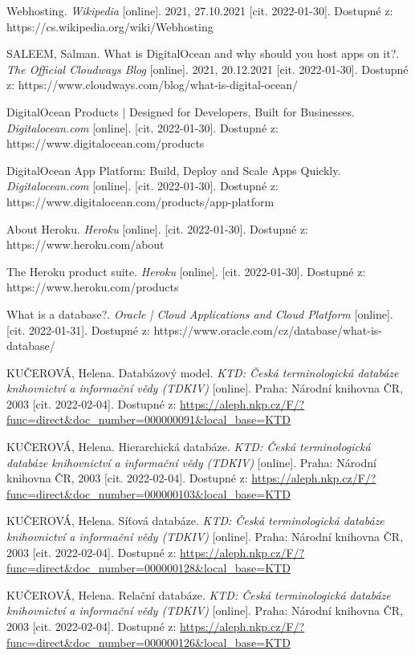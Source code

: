 \begin{thebibliography}{50}
Webhosting. \textit{Wikipedia} [online]. 2021, 27.10.2021 [cit. 2022-01-30]. Dostupné z: https://cs.wikipedia.org/wiki/Webhosting

SALEEM, Salman. What is DigitalOcean and why should you host apps on it?. \textit{The Official Cloudways Blog} [online]. 2021, 20.12.2021 [cit. 2022-01-30]. Dostupné z: https://www.cloudways.com/blog/what-is-digital-ocean/

DigitalOcean Products | Designed for Developers, Built for Businesses. \textit{Digitalocean.com} [online]. [cit. 2022-01-30]. Dostupné z: https://www.digitalocean.com/products

DigitalOcean App Platform: Build, Deploy and Scale Apps Quickly. \textit{Digitalocean.com} [online]. [cit. 2022-01-30]. Dostupné z: https://www.digitalocean.com/products/app-platform

About Heroku. \textit{Heroku} [online]. [cit. 2022-01-30]. Dostupné z: https://www.heroku.com/about

The Heroku product suite. \textit{Heroku} [online]. [cit. 2022-01-30]. Dostupné z: https://www.heroku.com/products

What is a database?. \textit{Oracle | Cloud Applications and Cloud Platform} [online]. [cit. 2022-01-31]. Dostupné z: https://www.oracle.com/cz/database/what-is-database/

KUČEROVÁ, Helena. Databázový model. \textit{KTD: Česká terminologická databáze knihovnictví a informační vědy (TDKIV)} [online]. Praha: Národní knihovna ČR, 2003 [cit. 2022-02-04]. Dostupné z: \url{https://aleph.nkp.cz/F/?func=direct&doc\_number=000000091&local\_base=KTD}

KUČEROVÁ, Helena. Hierarchická databáze. \textit{KTD: Česká terminologická databáze knihovnictví a informační vědy (TDKIV)} [online]. Praha: Národní knihovna ČR, 2003 [cit. 2022-02-04]. Dostupné z: \url{https://aleph.nkp.cz/F/?func=direct&doc\_number=000000103&local\_base=KTD}

KUČEROVÁ, Helena. Síťová databáze. \textit{KTD: Česká terminologická databáze knihovnictví a informační vědy (TDKIV)} [online]. Praha: Národní knihovna ČR, 2003 [cit. 2022-02-04]. Dostupné z: \url{https://aleph.nkp.cz/F/?func=direct&doc\_number=000000128&local\_base=KTD}

KUČEROVÁ, Helena. Relační databáze. \textit{KTD: Česká terminologická databáze knihovnictví a informační vědy (TDKIV)} [online]. Praha: Národní knihovna ČR, 2003 [cit. 2022-02-04]. Dostupné z: \url{https://aleph.nkp.cz/F/?func=direct&doc\_number=000000126&local\_base=KTD}


\end{thebibliography}
